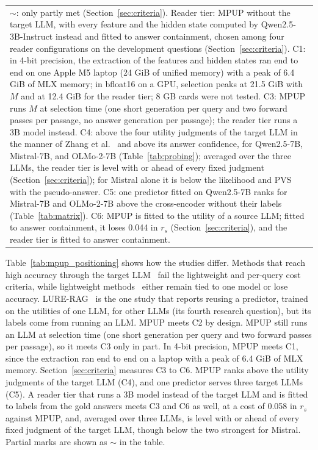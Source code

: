 \documentclass[conference]{IEEEtran}
\begin{document}
\begin{table}[htbp]
\begin{tabular}{lcccccc}
        \multicolumn{7}{p{0.93\columnwidth}}{\footnotesize $\sim$: only partly met (Section~\ref{sec:criteria}). Reader tier: MPUP without the target LLM, with every feature and the hidden state computed by Qwen2.5-3B-Instruct instead and fitted to answer containment, chosen among four reader configurations on the development questions (Section~\ref{sec:criteria}). C1: in 4-bit precision, the extraction of the features and hidden states ran end to end on one Apple M5 laptop (24 GiB of unified memory) with a peak of 6.4 GiB of MLX memory; in bfloat16 on a GPU, selection peaks at 21.5 GiB with $M$ and at 12.4 GiB for the reader tier; 8 GB cards were not tested. C3: MPUP runs $M$ at selection time (one short generation per query and two forward passes per passage, no answer generation per passage); the reader tier runs a 3B model instead. C4: above the four utility judgments of the target LLM in the manner of Zhang et al.~\cite{zhang2025c} and above its answer confidence, for Qwen2.5-7B, Mistral-7B, and OLMo-2-7B (Table~\ref{tab:probing}); averaged over the three LLMs, the reader tier is level with or ahead of every fixed judgment (Section~\ref{sec:criteria}); for Mistral alone it is below the likelihood and PVS with the pseudo-answer. C5: one predictor fitted on Qwen2.5-7B ranks for Mistral-7B and OLMo-2-7B above the cross-encoder without their labels (Table~\ref{tab:matrix}). C6: MPUP is fitted to the utility of a source LLM; fitted to answer containment, it loses 0.044 in $r_s$ (Section~\ref{sec:criteria}), and the reader tier is fitted to answer containment.} \\
    \end{tabular}
\end{table}

Table~\ref{tab:mpup_positioning} shows how the studies differ. Methods that reach high accuracy through the target LLM~\cite{zhang2025c,dai2025} fail the lightweight and per-query cost criteria, while lightweight methods~\cite{perez2025,tian2026} either remain tied to one model or lose accuracy. LURE-RAG~\cite{chandra2026} is the one study that reports reusing a predictor, trained on the utilities of one LLM, for other LLMs (its fourth research question), but its labels come from running an LLM. MPUP meets C2 by design. MPUP still runs an LLM at selection time (one short generation per query and two forward passes per passage), so it meets C3 only in part. In 4-bit precision, MPUP meets C1, since the extraction ran end to end on a laptop with a peak of 6.4 GiB of MLX memory. Section~\ref{sec:criteria} measures C3 to C6. MPUP ranks above the utility judgments of the target LLM (C4), and one predictor serves three target LLMs (C5). A reader tier that runs a 3B model instead of the target LLM and is fitted to labels from the gold answers meets C3 and C6 as well, at a cost of 0.058 in $r_s$ against MPUP, and, averaged over three LLMs, is level with or ahead of every fixed judgment of the target LLM, though below the two strongest for Mistral. Partial marks are shown as $\sim$ in the table.
\end{document}
